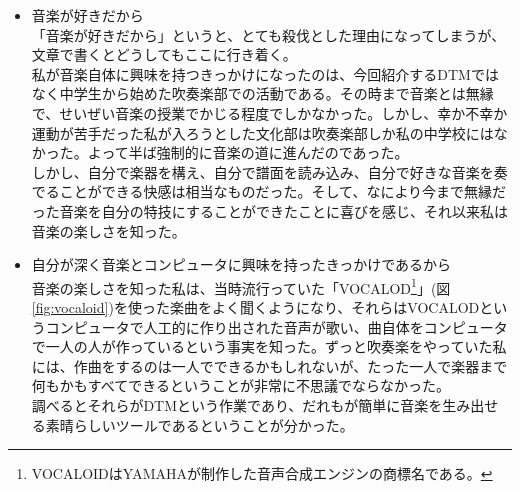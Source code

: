 \documentclass[ams]{U-AizuGT}
\begin{document}
\begin{itemize}
\item 音楽が好きだから\\
「音楽が好きだから」というと、とても殺伐とした理由になってしまうが、文章で書くとどうしてもここに行き着く。\\
私が音楽自体に興味を持つきっかけになったのは、今回紹介するDTMではなく中学生から始めた吹奏楽部での活動である。その時まで音楽とは無縁で、せいぜい音楽の授業でかじる程度でしかなかった。しかし、幸か不幸か運動が苦手だった私が入ろうとした文化部は吹奏楽部しか私の中学校にはなかった。よって半ば強制的に音楽の道に進んだのであった。\\
しかし、自分で楽器を構え、自分で譜面を読み込み、自分で好きな音楽を奏でることができる快感は相当なものだった。そして、なにより今まで無縁だった音楽を自分の特技にすることができたことに喜びを感じ、それ以来私は音楽の楽しさを知った。\\
\item 自分が深く音楽とコンピュータに興味を持ったきっかけであるから\\
  音楽の楽しさを知った私は、当時流行っていた「VOCALOD\footnote{VOCALOIDはYAMAHAが制作した音声合成エンジンの商標名である。}」(図\ref{fig:vocaloid})を使った楽曲をよく聞くようになり、それらはVOCALODというコンピュータで人工的に作り出された音声が歌い、曲自体をコンピュータで一人の人が作っているという事実を知った。ずっと吹奏楽をやっていた私には、作曲をするのは一人でできるかもしれないが、たった一人で楽器まで何もかもすべてできるということが非常に不思議でならなかった。\\
  調べるとそれらがDTMという作業であり、だれもが簡単に音楽を生み出せる素晴らしいツールであるということが分かった。\\
  \begin{figure}[htbp]
    \begin{center}

\end{center}
\end{figure}
\end{itemize}
\end{document}

